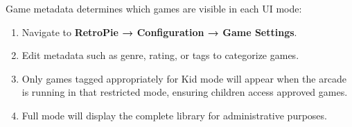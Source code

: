 Game metadata determines which games are visible in each UI mode:

\begin{enumerate}
    \item Navigate to \textbf{RetroPie → Configuration → Game Settings}.
    \item Edit metadata such as genre, rating, or tags to categorize games.
    \item Only games tagged appropriately for Kid mode will appear when the arcade is running in that restricted mode, ensuring children access approved games.
    \item Full mode will display the complete library for administrative purposes.
\end{enumerate}
